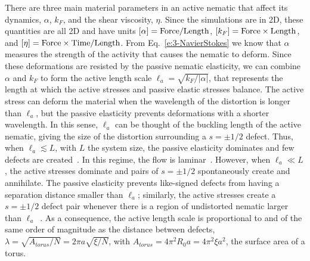 There are three main material parameters in an active nematic that affect its dynamics, $\alpha$, $k_F$, and the shear viscosity, $\eta$.
Since the simulations are in 2D, these quantities are all 2D and have units $[\alpha] = {\rm Force}/{\rm Length}$, $[k_F] = {\rm Force} \times {\rm Length}$, and $[\eta] = {\rm Force} \times {\rm Time} / {\rm Length}$.
From Eq.~\ref{e:3-NavierStokes} we know that $\alpha$ measures the strength of the activity that causes the nematic to deform.
Since these deformations are resisted by the passive nematic elasticity, we can combine $\alpha$ and $k_F$ to form the active length scale $\ell_a = \sqrt{k_F / |\alpha|}$, that represents the length at which the active stresses and passive elastic stresses balance.
The active stress can deform the material when the wavelength of the distortion is longer than $\ell_a$, but the passive elasticity prevents deformations with a shorter wavelength.
In this sense, $\ell_a$ can be thought of the buckling length of the active nematic, giving the size of the distortion surrounding a $s = \pm 1/2$ defect.
Thus, when $\ell_a \lesssim L$, with $L$ the system size, the passive elasticity dominates and few defects are created~\cite{RN7}.
In this regime, the flow is laminar~\cite{RN7}.
However, when $\ell_a \ll L$, the active stresses dominate and pairs of $s = \pm 1/2$ spontaneously create and annihilate.
The passive elasticity prevents like-signed defects from having a separation distance smaller than $\ell_a$; similarly, the active stresses create a $s = \pm 1/2$ defect pair whenever there is a region of undistorted nematic larger than $\ell_a$~\cite{RN7}.
As a consequence, the active length scale is proportional to and of the same order of magnitude as the distance between defects, $\lambda = \sqrt{A_{torus}/N} = 2 \pi a \sqrt{\xi/N}$, with $A_{torus} = 4 \pi^2 R_0 a = 4 \pi^2 \xi a^2$, the surface area of a torus.

